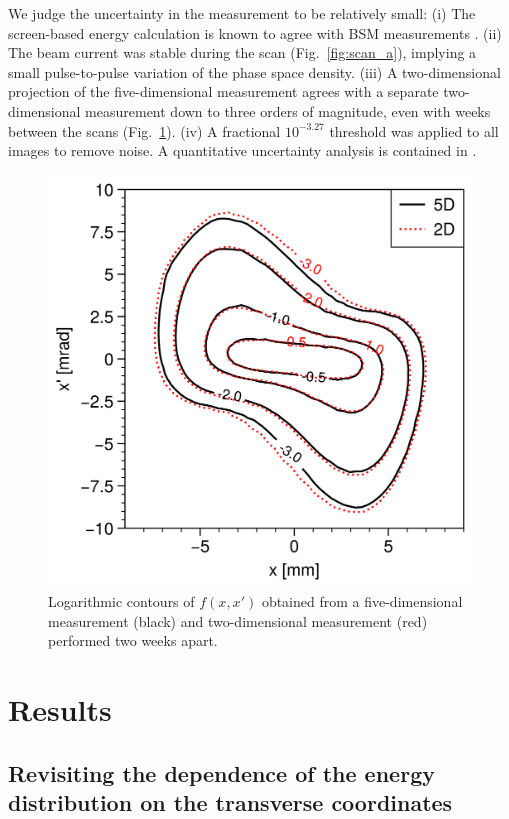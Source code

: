 \documentclass[%
 reprint,
 amsmath,amssymb,
 aps,
prstab,
]{revtex4-2}
\begin{document}
We judge the uncertainty in the measurement to be relatively small: (i) The screen-based energy calculation is known to agree with BSM measurements \cite{Cathey2018-thesis}. (ii) The beam current was stable during the scan (Fig.~\ref{fig:scan_a}), implying a small pulse-to-pulse variation of the phase space density. (iii) A two-dimensional projection of the five-dimensional measurement agrees with a separate two-dimensional measurement down to three orders of magnitude, even with weeks between the scans (Fig.~\ref{fig:5D_vs_2D}). (iv) A fractional $10^{-3.27}$ threshold was applied to all images to remove noise. A quantitative uncertainty analysis is contained in \cite{Cathey2018-thesis}. 


%
\begin{figure}[]
    \centering
    \includegraphics[width=0.73\columnwidth]{fig_5D_vs_2D.png}
    \caption{Logarithmic contours of $f(x, x')$ obtained from a five-dimensional measurement (black) and two-dimensional measurement (red) performed two weeks apart.}
    \label{fig:5D_vs_2D}
\end{figure}
%


\section{Results}\label{sec:results}

\subsection{Revisiting the dependence of the energy distribution on the transverse coordinates}\label{sec:results-a}
\end{document}
